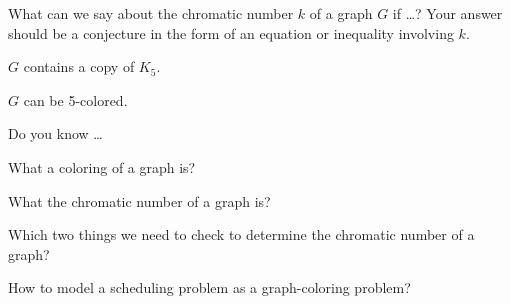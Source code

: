 \begin{exer}[\exerU] %
\label{exer_chr_ineq}
    What can we say about the chromatic number $k$ of a graph $G$ if \ldots?  Your answer should be a conjecture in the form of an equation or inequality involving $k$.
        \begin{exerpart}
            \item $G$ contains a copy of $K_5$.
            \item $G$ can be 5-colored.
        \end{exerpart}
\end{exer}

\begin{exer}[\exerR] %
\label{exer_dyk_color_graphs}
    Do you know \ldots
        \begin{exerpart}
            \item What a coloring of a graph is?
            \item What the chromatic number of a graph is?
            \item Which two things we need to check to determine the chromatic number of a graph?
            \item How to model a scheduling problem as a graph-coloring problem? 
        \end{exerpart}
\end{exer}

